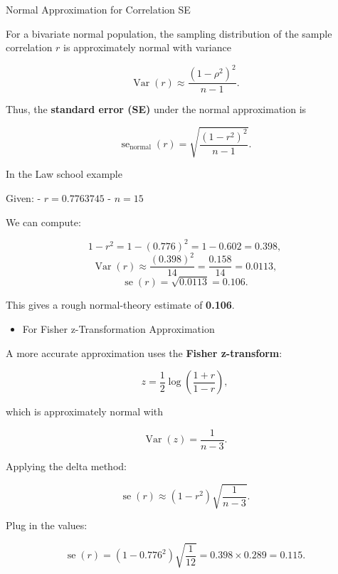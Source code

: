 \documentclass[
  letterpaper,
  DIV=11,
  numbers=noendperiod]{scrreprt}
\providecommand{\tightlist}{%
  \setlength{\itemsep}{0pt}\setlength{\parskip}{0pt}}
\begin{document}
\begin{tcolorbox}[enhanced jigsaw, bottomtitle=1mm, rightrule=.15mm, colframe=quarto-callout-note-color-frame, coltitle=black, opacitybacktitle=0.6, breakable, colbacktitle=quarto-callout-note-color!10!white, leftrule=.75mm, toptitle=1mm, titlerule=0mm, toprule=.15mm, opacityback=0, title=\textcolor{quarto-callout-note-color}{\faInfo}\hspace{0.5em}{Normal theory for SE (will not be on exam)}, colback=white, arc=.35mm, bottomrule=.15mm, left=2mm]

Normal Approximation for Correlation SE

For a bivariate normal population, the sampling distribution of the
sample correlation \(r\) is approximately normal with variance

\[
\operatorname{Var}(r) \approx \frac{(1 - \rho^2)^2}{n - 1}.
\]

Thus, the \textbf{standard error (SE)} under the normal approximation is

\[
\operatorname{se}_{\text{normal}}(r) = \sqrt{\frac{(1 - r^2)^2}{n - 1}}.
\]

In the Law school example

Given: - \(r = 0.7763745\) - \(n = 15\)

We can compute:

\[
1 - r^2 = 1 - (0.776)^2 = 1 - 0.602 = 0.398,
\] \[
\operatorname{Var}(r) \approx \frac{(0.398)^2}{14} = \frac{0.158}{14} = 0.0113,
\] \[
\operatorname{se}(r) = \sqrt{0.0113} = 0.106.
\]

This gives a rough normal-theory estimate of \textbf{0.106}.

\begin{itemize}
\tightlist
\item
  For Fisher z-Transformation Approximation
\end{itemize}

A more accurate approximation uses the \textbf{Fisher z-transform}:

\[
z = \frac{1}{2}\log\!\left(\frac{1 + r}{1 - r}\right),
\]

which is approximately normal with

\[
\operatorname{Var}(z) = \frac{1}{n - 3}.
\]

Applying the delta method:

\[
\operatorname{se}(r) \approx (1 - r^2)\sqrt{\frac{1}{n - 3}}.
\]

Plug in the values:

\[
\operatorname{se}(r) = (1 - 0.776^2)\sqrt{\frac{1}{12}} = 0.398 \times 0.289 = 0.115.
\]


\end{tcolorbox}
\end{document}
